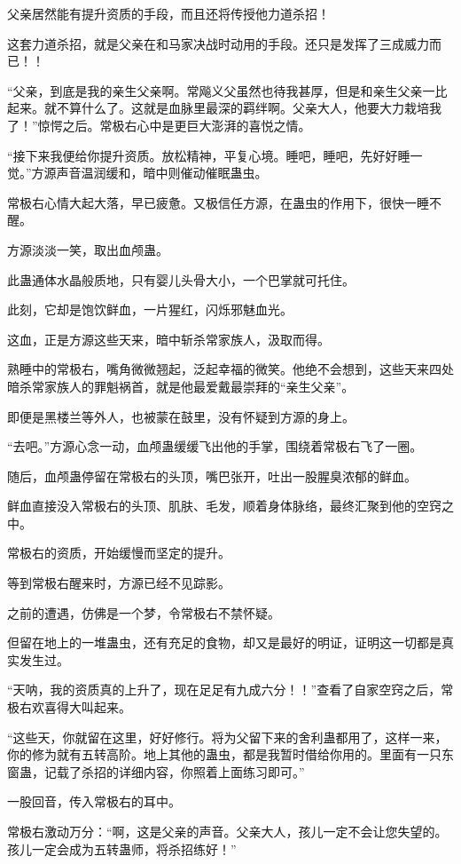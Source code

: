\begin{this_body}
父亲居然能有提升资质的手段，而且还将传授他力道杀招！

这套力道杀招，就是父亲在和马家决战时动用的手段。还只是发挥了三成威力而已！！

“父亲，到底是我的亲生父亲啊。常飚义父虽然也待我甚厚，但是和亲生父亲一比起来。就不算什么了。这就是血脉里最深的羁绊啊。父亲大人，他要大力栽培我了！”惊愕之后。常极右心中是更巨大澎湃的喜悦之情。

“接下来我便给你提升资质。放松精神，平复心境。睡吧，睡吧，先好好睡一觉。”方源声音温润缓和，暗中则催动催眠蛊虫。

常极右心情大起大落，早已疲惫。又极信任方源，在蛊虫的作用下，很快一睡不醒。

方源淡淡一笑，取出血颅蛊。

此蛊通体水晶般质地，只有婴儿头骨大小，一个巴掌就可托住。

此刻，它却是饱饮鲜血，一片猩红，闪烁邪魅血光。

这血，正是方源这些天来，暗中斩杀常家族人，汲取而得。

熟睡中的常极右，嘴角微微翘起，泛起幸福的微笑。他绝不会想到，这些天来四处暗杀常家族人的罪魁祸首，就是他最爱戴最崇拜的“亲生父亲”。

即便是黑楼兰等外人，也被蒙在鼓里，没有怀疑到方源的身上。

“去吧。”方源心念一动，血颅蛊缓缓飞出他的手掌，围绕着常极右飞了一圈。

随后，血颅蛊停留在常极右的头顶，嘴巴张开，吐出一股腥臭浓郁的鲜血。

鲜血直接没入常极右的头顶、肌肤、毛发，顺着身体脉络，最终汇聚到他的空窍之中。

常极右的资质，开始缓慢而坚定的提升。

等到常极右醒来时，方源已经不见踪影。

之前的遭遇，仿佛是一个梦，令常极右不禁怀疑。

但留在地上的一堆蛊虫，还有充足的食物，却又是最好的明证，证明这一切都是真实发生过。

“天呐，我的资质真的上升了，现在足足有九成六分！！”查看了自家空窍之后，常极右欢喜得大叫起来。

“这些天，你就留在这里，好好修行。将为父留下来的舍利蛊都用了，这样一来，你的修为就有五转高阶。地上其他的蛊虫，都是我暂时借给你用的。里面有一只东窗蛊，记载了杀招的详细内容，你照着上面练习即可。”

一股回音，传入常极右的耳中。

常极右激动万分：“啊，这是父亲的声音。父亲大人，孩儿一定不会让您失望的。孩儿一定会成为五转蛊师，将杀招练好！”


\end{this_body}
